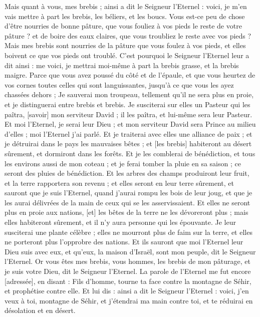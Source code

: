 \begin{multicols}{2}
Mais quant à vous, mes brebis ; ainsi a dit le Seigneur l'Eternel : voici, je m'en vais mettre à part les brebis, les béliers, et les boucs.
Vous est-ce peu de chose d'être nourries de bonne pâture, que vous fouliez à vos pieds le reste de votre pâture ? et de boire des eaux claires, que vous troubliez le reste avec vos pieds ?
Mais mes brebis sont nourries de la pâture que vous foulez à vos pieds, et elles boivent ce que vos pieds ont troublé.
C'est pourquoi le Seigneur l'Eternel leur a dit ainsi : me voici, je mettrai moi-même à part la brebis grasse, et la brebis maigre.
Parce que vous avez poussé du côté et de l'épaule, et que vous heurtez de vos cornes toutes celles qui sont languissantes, jusqu'à ce que vous les ayez chassées dehors ;
Je sauverai mon troupeau, tellement qu'il ne sera plus en proie, et je distinguerai entre brebis et brebis.
Je susciterai sur elles un Pasteur qui les paîtra, [savoir] mon serviteur David ; il les paîtra, et lui-même sera leur Pasteur.
Et moi l'Eternel, je serai leur Dieu ; et mon serviteur David sera Prince au milieu d'elles ; moi l'Eternel j'ai parlé.
Et je traiterai avec elles une alliance de paix ; et je détruirai dans le pays les mauvaises bêtes ; et [les brebis] habiteront au désert sûrement, et dormiront dans les forêts.
Et je les comblerai de bénédiction, et tous les environs aussi de mon coteau ; et je ferai tomber la pluie en sa saison ; ce seront des pluies de bénédiction.
Et les arbres des champs produiront leur fruit, et la terre rapportera son revenu ; et elles seront en leur terre sûrement, et sauront que je suis l'Eternel, quand j'aurai rompu les bois de leur joug, et que je les aurai délivrées de la main de ceux qui se les asservissaient.
Et elles ne seront plus en proie aux nations, [et] les bêtes de la terre ne les dévoreront plus ; mais elles habiteront sûrement, et il n'y aura personne qui les épouvante.
Je leur susciterai une plante célèbre ; elles ne mourront plus de faim sur la terre, et elles ne porteront plus l'opprobre des nations.
Et ils sauront que moi l'Eternel leur Dieu suis avec eux, et qu'eux, la maison d'Israël, sont mon peuple, dit le Seigneur l'Eternel.
Or vous êtes mes brebis, vous hommes, les brebis de mon pâturage, et je suis votre Dieu, dit le Seigneur l'Eternel.
\VerseOne{}La parole de l'Eternel me fut encore [adressée], en disant :
Fils d'homme, tourne ta face contre la montagne de Séhir, et prophétise contre elle.
Et lui dis : ainsi a dit le Seigneur l'Eternel : voici, j'en veux à toi, montagne de Séhir, et j'étendrai ma main contre toi, et te réduirai en désolation et en désert.

\end{multicols}
